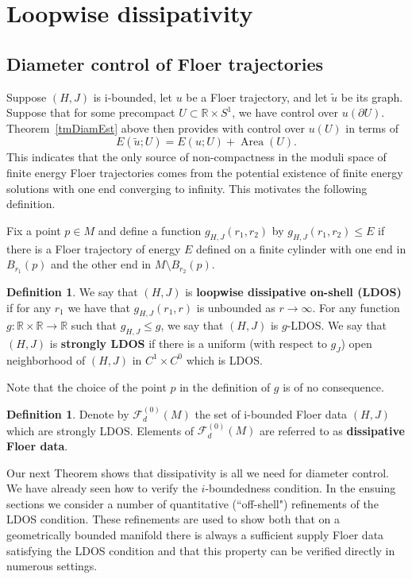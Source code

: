 \documentclass[11pt]{amsart}
\newcommand{\R}{\mathbb{R}}
\DeclareMathOperator{\area}{Area}
\theoremstyle{definition}
\newtheorem{df}[tm]{Definition}
\theoremstyle{remark}
\begin{document}
\section{Loopwise dissipativity}\label{Sec5}
\subsection{Diameter control of Floer trajectories}
Suppose $(H,J)$ is i-bounded, let $u$ be a Floer trajectory, and let $\tilde{u}$ be its graph. Suppose that for some precompact $U\subset \R\times S^1$, we have control over $u(\partial U)$. Theorem~\ref{tmDiamEst} above then provides with control over $u(U)$ in terms of
\[
E(\tilde{u};U)=E(u;U)+\area(U).
\]
This indicates that the only source of non-compactness in the moduli space of finite energy Floer trajectories comes from the potential existence of finite energy solutions with one end converging to infinity. This motivates the following definition.

Fix a point $p\in M$ and define a function $g_{H,J}(r_1,r_2)$ by $g_{H,J}(r_1,r_2)\leq E$ if there is a Floer trajectory of energy $E$ defined on a finite cylinder with one end in $B_{r_1}(p)$ and the other end in $M\setminus B_{r_2}(p)$.

\begin{df}
We say that $(H,J)$ is \textbf{loopwise dissipative on-shell (LDOS)} if for any $r_1$ we have that $g_{H,J}(r_1,r)$ is unbounded as $r\to\infty$. For any function $g:\R\times\R\to\R$ such that $g_{H,J}\leq g$, we say that $(H,J)$ is $g$-LDOS. We say that $(H,J)$ is \textbf{strongly LDOS} if there is a uniform (with respect to $g_J$) open neighborhood of $(H,J)$ in $C^1\times C^0$ which is LDOS.
\end{df}
Note that the choice of the point $p$ in the definition of $g$ is of no consequence.
\begin{df}
Denote by $\mathcal{F}_d^{(0)}(M)$ the set of i-bounded Floer data $(H,J)$ which are strongly LDOS. Elements of $\mathcal{F}_d^{(0)}(M)$ are referred to as \textbf{dissipative Floer data}.
\end{df}
Our next Theorem shows that dissipativity is all we need for diameter control. We have already seen how to verify the $i$-boundedness condition. In the ensuing sections we consider a number of quantitative (``off-shell") refinements of the LDOS condition. These refinements are used to show both that on a geometrically bounded manifold there is always a sufficient supply Floer data satisfying the LDOS condition and that this property can be verified directly in numerous settings.
\end{document}
